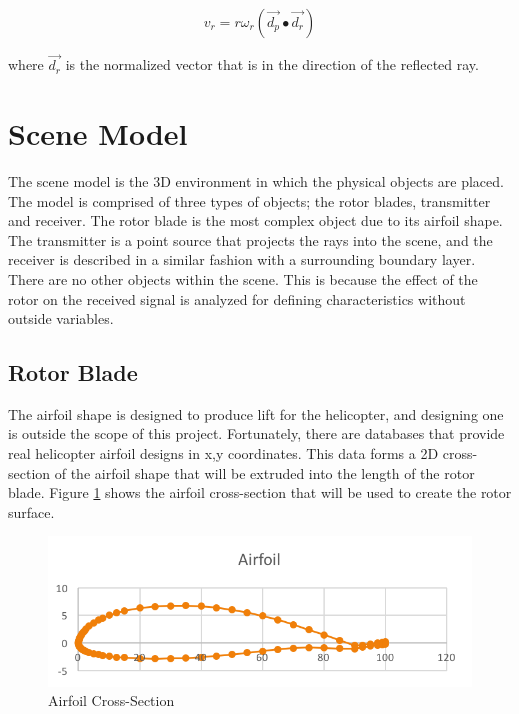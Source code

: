 \begin{equation}
	v_r = r \omega_r (\vec{d_p} \bullet \vec{d_r})
	\label{eqn:v_r}
\end{equation}

where $\vec{d_r}$ is the normalized vector that is in the direction of the reflected ray.

\section{Scene Model}
The scene model is the 3D environment in which the physical objects are placed. 
The model is comprised of three types of objects; the rotor blades, transmitter and receiver. The rotor blade is the most complex object due to its airfoil shape. The transmitter is a point source that projects the rays into the scene, and the receiver is described in a similar fashion with a surrounding boundary layer. There are no other objects within the scene. This is because the effect of the rotor on the received signal is analyzed for defining characteristics without outside variables.

\subsection{Rotor Blade}
The airfoil shape is designed to produce lift for the helicopter, and designing one is outside the scope of this project. Fortunately, there are databases that provide real helicopter airfoil designs in x,y coordinates. This data forms a 2D cross-section of the airfoil shape that will be extruded into the length of the rotor blade. Figure \ref{fig:airfoil} shows the airfoil cross-section that will be used to create the rotor surface. 

\begin{figure}
	\begin{center}
		\includegraphics[width=15cm]{images/radio_propagation/2d_airfoil.png}
		\caption{Airfoil Cross-Section}
		\label{fig:airfoil}
	\end{center}
\end{figure}

